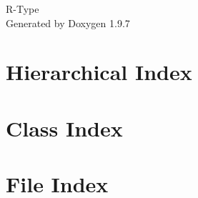 \documentclass[twoside]{book}
\newcommand{\+}{\discretionary{\mbox{\scriptsize$\hookleftarrow$}}{}{}}
\newcommand{\clearemptydoublepage}{%
    \newpage{\pagestyle{empty}\cleardoublepage}%
  }
\begin{document}
  \raggedbottom
    \hypersetup{pageanchor=false,
                bookmarksnumbered=true,
                pdfencoding=unicode
               }
  \begin{titlepage}
  \vspace*{7cm}
  \begin{center}%
  {\Large R-\/\+Type}\\
  \vspace*{1cm}
  {\large Generated by Doxygen 1.9.7}\\
  \end{center}
  \end{titlepage}
  \clearemptydoublepage
  \tableofcontents
  \clearemptydoublepage
  \hypersetup{pageanchor=true}
\chapter{Hierarchical Index}

\chapter{Class Index}

\chapter{File Index}

\end{document}
